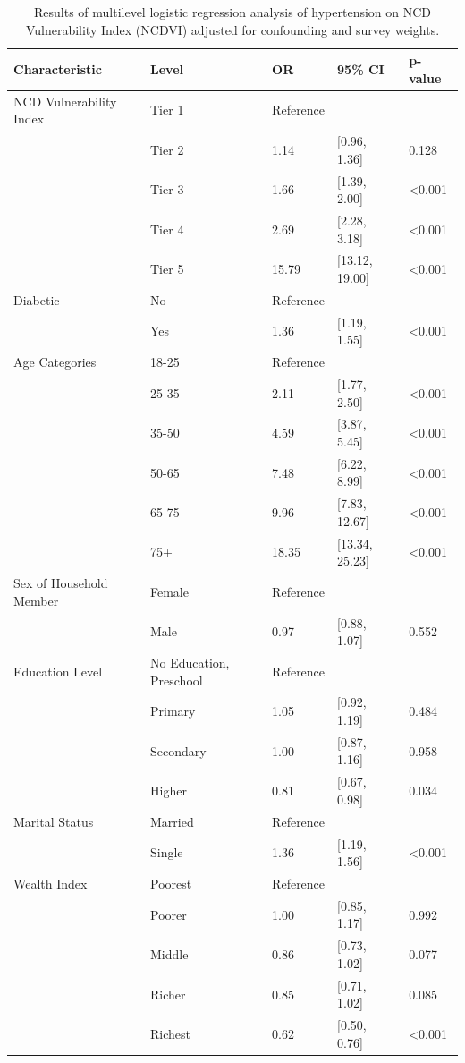 \documentclass[
  12pt,
  a4paper]{article}
\begin{document}
\begin{longtable}[t]{lllll}
\caption{\label{tab:multitab}Results of multilevel logistic regression analysis of hypertension on NCD Vulnerability Index (NCDVI) adjusted for confounding and survey weights.}\\
\toprule
Characteristic & Level & OR & 95\% CI & p-value\\
\midrule
NCD Vulnerability Index & Tier 1 & Reference &  & \\
 & Tier 2 & 1.14 & {}[0.96, 1.36] & 0.128\\
 & Tier 3 & 1.66 & {}[1.39, 2.00] & <0.001\\
 & Tier 4 & 2.69 & {}[2.28, 3.18] & <0.001\\
 & Tier 5 & 15.79 & {}[13.12, 19.00] & <0.001\\
Diabetic & No & Reference &  & \\
 & Yes & 1.36 & {}[1.19, 1.55] & <0.001\\
Age Categories & 18-25 & Reference &  & \\
 & 25-35 & 2.11 & {}[1.77, 2.50] & <0.001\\
 & 35-50 & 4.59 & {}[3.87, 5.45] & <0.001\\
 & 50-65 & 7.48 & {}[6.22, 8.99] & <0.001\\
 & 65-75 & 9.96 & {}[7.83, 12.67] & <0.001\\
 & 75+ & 18.35 & {}[13.34, 25.23] & <0.001\\
Sex of Household Member & Female & Reference &  & \\
 & Male & 0.97 & {}[0.88, 1.07] & 0.552\\
Education Level & No Education, Preschool & Reference &  & \\
 & Primary & 1.05 & {}[0.92, 1.19] & 0.484\\
 & Secondary & 1.00 & {}[0.87, 1.16] & 0.958\\
 & Higher & 0.81 & {}[0.67, 0.98] & 0.034\\
Marital Status & Married & Reference &  & \\
 & Single & 1.36 & {}[1.19, 1.56] & <0.001\\
Wealth Index & Poorest & Reference &  & \\
 & Poorer & 1.00 & {}[0.85, 1.17] & 0.992\\
 & Middle & 0.86 & {}[0.73, 1.02] & 0.077\\
 & Richer & 0.85 & {}[0.71, 1.02] & 0.085\\
 & Richest & 0.62 & {}[0.50, 0.76] & <0.001\\

\end{longtable}
\end{document}
